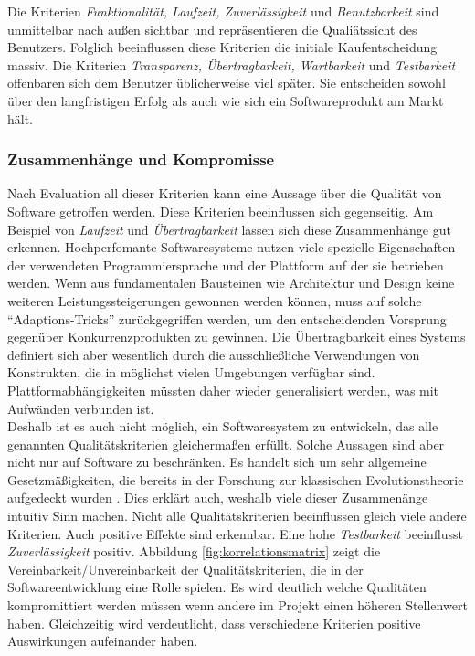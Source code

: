 Die Kriterien \textit{Funktionalität, Laufzeit, Zuverlässigkeit} und \textit{Benutzbarkeit} sind unmittelbar nach außen sichtbar und repräsentieren die Qualiätssicht des Benutzers. Folglich beeinflussen diese Kriterien die initiale Kaufentscheidung massiv. Die Kriterien \textit{Transparenz, Übertragbarkeit, Wartbarkeit} und \textit{Testbarkeit} offenbaren sich dem Benutzer üblicherweise viel später. Sie entscheiden sowohl über den langfristigen Erfolg als auch wie sich ein Softwareprodukt am Markt hält.

\subsubsection{Zusammenhänge und Kompromisse} 
Nach Evaluation all dieser Kriterien kann eine Aussage über die Qualität von Software getroffen werden. Diese Kriterien beeinflussen sich gegenseitig. Am Beispiel von \textit{Laufzeit} und \textit{Übertragbarkeit} lassen sich diese Zusammenhänge gut erkennen. Hochperfomante Softwaresysteme nutzen viele spezielle Eigenschaften der verwendeten Programmiersprache und der Plattform auf der sie betrieben werden. Wenn aus fundamentalen Bausteinen wie Architektur und Design keine weiteren Leistungssteigerungen gewonnen werden können, muss auf solche ``Adaptions-Tricks'' zurückgegriffen werden, um den entscheidenden Vorsprung gegenüber Konkurrenzprodukten zu gewinnen. Die Übertragbarkeit eines Systems definiert sich aber wesentlich durch die ausschließliche Verwendungen von Konstrukten, die in möglichst vielen Umgebungen verfügbar sind. Plattformabhängigkeiten müssten daher wieder generalisiert werden, was mit Aufwänden verbunden ist.\\
Deshalb ist es auch nicht möglich, ein Softwaresystem zu entwickeln, das alle genannten Qualitätskriterien gleichermaßen erfüllt. Solche Aussagen sind aber nicht nur auf Software zu beschränken. Es handelt sich um sehr allgemeine Gesetzmäßigkeiten, die bereits in der Forschung zur klassischen Evolutionstheorie aufgedeckt wurden \cite{hoffmann_software-qualitat_2013}. Dies erklärt auch, weshalb viele dieser Zusammenänge intuitiv Sinn machen. Nicht alle Qualitätskriterien beeinflussen gleich viele andere Kriterien. Auch positive Effekte sind erkennbar. Eine hohe \textit{Testbarkeit} beeinflusst \textit{Zuverlässigkeit} positiv. Abbildung \ref{fig:korrelationsmatrix} zeigt die Vereinbarkeit/Unvereinbarkeit der Qualitätskriterien, die in der Softwareentwicklung eine Rolle spielen. Es wird deutlich welche Qualitäten kompromittiert werden müssen wenn andere im Projekt einen höheren Stellenwert haben. Gleichzeitig wird verdeutlicht, dass verschiedene Kriterien positive Auswirkungen aufeinander haben.

